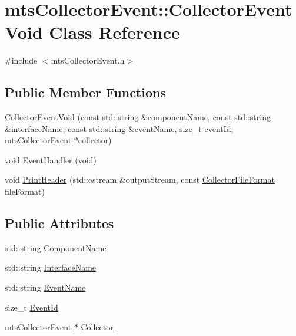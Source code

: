 \hypertarget{classmts_collector_event_1_1_collector_event_void}{}\section{mts\+Collector\+Event\+:\+:Collector\+Event\+Void Class Reference}
\label{classmts_collector_event_1_1_collector_event_void}


{\ttfamily \#include $<$mts\+Collector\+Event.\+h$>$}

\subsection*{Public Member Functions}
\begin{DoxyCompactItemize}
\item 
\hyperlink{classmts_collector_event_1_1_collector_event_void_a1778ca501149cc782270214389d58377}{Collector\+Event\+Void} (const std\+::string \&component\+Name, const std\+::string \&interface\+Name, const std\+::string \&event\+Name, size\+\_\+t event\+Id, \hyperlink{classmts_collector_event}{mts\+Collector\+Event} $\ast$collector)
\item 
void \hyperlink{classmts_collector_event_1_1_collector_event_void_a8499a95da2b6c0b5d4021beb10aada8d}{Event\+Handler} (void)
\item 
void \hyperlink{classmts_collector_event_1_1_collector_event_void_a0d13838f8781f04139ae21873161bc96}{Print\+Header} (std\+::ostream \&output\+Stream, const \hyperlink{group__cisst_multi_task_gaa228bed8144053d0bfa316f9ac9d0901}{Collector\+File\+Format} file\+Format)
\end{DoxyCompactItemize}
\subsection*{Public Attributes}
\begin{DoxyCompactItemize}
\item 
std\+::string \hyperlink{classmts_collector_event_1_1_collector_event_void_af7494d63892c827f73543dadcc919df7}{Component\+Name}
\item 
std\+::string \hyperlink{classmts_collector_event_1_1_collector_event_void_a40cc93e11bb1411b32e608030473939d}{Interface\+Name}
\item 
std\+::string \hyperlink{classmts_collector_event_1_1_collector_event_void_a5519a90042bb42041e6aea5e4859952c}{Event\+Name}
\item 
size\+\_\+t \hyperlink{classmts_collector_event_1_1_collector_event_void_a50253a8a23a0e44f3da25bbf006a544b}{Event\+Id}
\item 
\hyperlink{classmts_collector_event}{mts\+Collector\+Event} $\ast$ \hyperlink{classmts_collector_event_1_1_collector_event_void_a06032b3263c7e19f5bbe84ad3c5730db}{Collector}
\end{DoxyCompactItemize}


